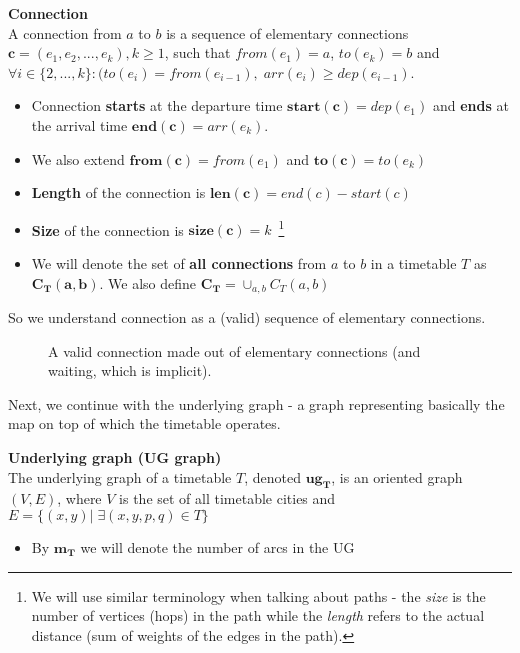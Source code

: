    	\begin{definition}
        \textbf{Connection} \\
        A connection from $a$ to $b$ is a sequence of elementary connections $\bm{c} = (e_{1}, e_{2}, ..., e_{k}), k \geq 1$, such that $from(e_{1}) = a$, $to(e_{k}) = b$ and $\forall i \in \{2, ..., k\}: (to(e_{i}) = from(e_{i - 1}), \; arr(e_{i}) \geq dep(e_{i - 1})$.
        \begin{itemize}
			\item Connection \textbf{starts} at the departure time $\bm{start(c)} = dep(e_{1})$ and \textbf{ends} at the arrival time $\bm{end(c)} = arr(e_{k})$.
			\item We also extend $\bm{from(c)} = from(e_{1})$ and $\bm{to(c)} = to(e_{k})$
	        \item \textbf{Length} of the connection is $\bm{len(c)} = end(c) - start(c)$
	        \item \textbf{Size} of the connection is $\bm{size(c)} = k$~\footnote{We will use similar terminology when talking about paths - the \textit{size} is the number of vertices (hops) in the path while the \textit{length} refers to the actual distance (sum of weights of the edges in the path).}
	        \item We will denote the set of \textbf{all connections} from $a$ to $b$ in a timetable $T$ as $\bm{C_{T}(a, b)}$. We also define $\bm{C_{T}} = \cup_{a, b} C_{T}(a, b)$
        \end{itemize}
    \end{definition}
    
    \noindent So we understand connection as a (valid) sequence of elementary connections. 
    
    \begin{figure}[h!]
        \begin{center}
        \end{center}
		\caption{\label{pic:conn} A valid connection made out of \textcolor{elcon-clr}{elementary connections} (and \textcolor{waiting-clr}{waiting}, which is implicit).}
	\end{figure}
	
	\noindent Next, we continue with the underlying graph - a graph representing basically the map on top of which the timetable operates.
	
	\begin{definition}
        \textbf{Underlying graph (UG graph)} \\
        The underlying graph of a timetable $T$, denoted $\bm{ug_{T}}$, is an oriented graph $(V, E)$, where $V$ is the set of all timetable cities and $E = \{(x, y)|\; \exists (x, y, p, q) \in T\}$
        \begin{itemize}
        	\item By $\bm{m_{T}}$ we will denote the number of arcs in the UG
        \end{itemize}
    \end{definition}
    
